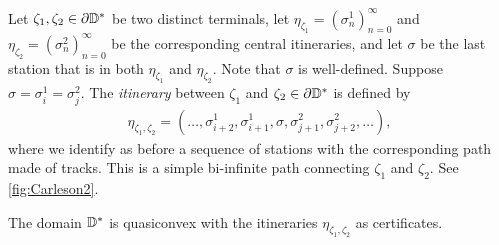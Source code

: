 \begin{definition} \label{def-disk-itinerary} Let $\zeta_{1},\zeta_{2}\in\partial\mathbb{D}^*$ be two distinct terminals, let  $\eta_{\zeta_{1}}=\left(\sigma_{n}^{1}\right)_{n=0}^{\infty}$ and 
	$\eta_{\zeta_{2}}=\left(\sigma_{n}^{2}\right)_{n=0}^{\infty}$
	 be the corresponding central itineraries, and let $\sigma$ be the last station that is in both $\eta_{\zeta_{1}}$ and $\eta_{\zeta_{2}}$. Note that $\sigma$ is well-defined.	 
	 Suppose $\sigma=\sigma^1_i=\sigma^2_j$. The \emph{itinerary} between  $\zeta_{1}$ and $\zeta_{2}\in\partial\mathbb{D}^*$ is defined by  %
 \begin{gather*}
 \eta_{\zeta_{1},\zeta_{2}}=  \left(\dots,\sigma_{i+2}^{1},\sigma_{i+1}^{1},\sigma,\sigma_{j+1}^{2},\sigma_{j+2}^{2},\dots\right),
 \end{gather*}
where we identify as before a sequence of stations with the corresponding path made of tracks.
	This is a simple bi-infinite path connecting $\zeta_{1}$ and $\zeta_{2}$. See \cref{fig:Carleson2}. 
\end{definition}


\begin{theorem} \label{quasiconvex disk}
The domain $\mathbb{D}^{*}$ is quasiconvex with the itineraries $\eta_{\zeta_1,\zeta_2}$ as certificates.
\end{theorem}

